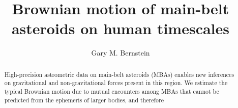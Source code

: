 \documentclass[linenumbers, onecolumn]{aastex631}
\begin{document}
\title{Brownian motion of main-belt asteroids on human timescales} 

\author[0000-0002-8613-8259]{Gary M. Bernstein}


\begin{abstract}
%
High-precision astrometric data on main-belt
asteroids (MBAs) enables new
inferences on gravitational and non-gravitational forces present in
this region.  We estimate the typical Brownian motion due to mutual encounters among
MBAs that cannot be predicted from the ephemeris of larger bodies, and therefore

\end{abstract}
\end{document}
